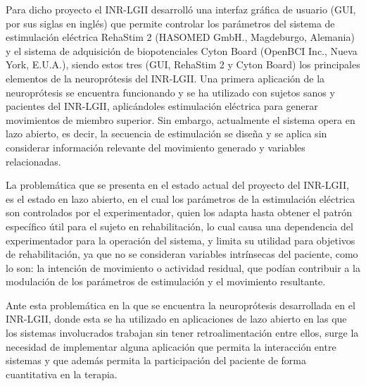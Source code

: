Para dicho proyecto el INR-LGII desarrolló una interfaz gráfica de usuario (GUI, por sus siglas en inglés) que permite controlar los parámetros del sistema de estimulación eléctrica RehaStim 2 (HASOMED GmbH., Magdeburgo, Alemania) y el sistema de adquisición de biopotenciales Cyton Board (OpenBCI Inc., Nueva York, E.U.A.), siendo estos tres (GUI, RehaStim 2 y Cyton Board) los principales elementos de la neuroprótesis del INR-LGII. Una primera aplicación de la neuroprótesis se encuentra funcionando y se ha utilizado con sujetos sanos y pacientes del INR-LGII, aplicándoles estimulación eléctrica para generar movimientos de miembro superior. Sin embargo, actualmente el sistema opera en lazo abierto, es decir, la secuencia de estimulación se diseña y se aplica sin considerar información relevante del movimiento generado y variables relacionadas.

La problemática que se presenta en el estado actual del proyecto del INR-LGII, es el estado en lazo abierto, en el cual los parámetros de la estimulación eléctrica son controlados por el experimentador, quien los adapta hasta obtener el patrón específico útil para el sujeto en rehabilitación, lo cual causa una dependencia del experimentador para la operación del sistema, y limita su utilidad para objetivos de rehabilitación, ya que no se consideran variables intrínsecas del paciente, como lo son: la intención de movimiento o actividad residual, que podían contribuir a la modulación de los parámetros de estimulación y el movimiento resultante.



Ante esta problemática en la que se encuentra la neuroprótesis desarrollada en el INR-LGII, donde esta se ha utilizado en aplicaciones de lazo abierto en las que los sistemas involucrados trabajan sin tener retroalimentación entre ellos, surge la necesidad de implementar alguna aplicación que permita la interacción entre sistemas y que además permita la participación del paciente de forma cuantitativa en la terapia.

